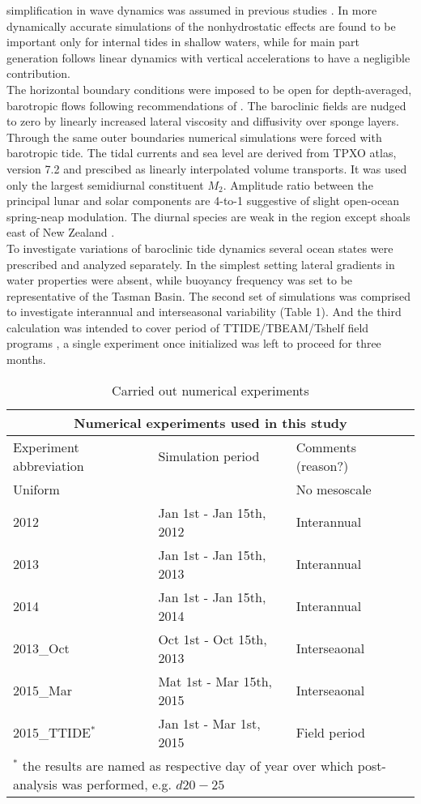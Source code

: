 \documentclass[12pt]{article}
\begin{document}
simplification in wave dynamics was assumed in previous studies \citep{carter2008energetics, 
merrifield2001generation,  merrifield2002model, kerry2013effects}. In more dynamically accurate   
simulations of \citep{kang2012energetics, zhang2011three} the nonhydrostatic effects are found to 
be important only for internal tides in shallow waters, while for main part generation follows 
linear dynamics with vertical accelerations to have a negligible contribution.\\
The horizontal boundary conditions were imposed to be open for depth-averaged, barotropic flows 
following recommendations of \citep{marchesiello2001open}. The baroclinic fields are 
nudged to zero by linearly increased lateral viscosity and diffusivity over sponge layers. Through 
the same outer boundaries numerical simulations were forced with barotropic tide. The tidal 
currents and sea level are derived from TPXO atlas, version 7.2 \citep{egbert2002efficient} and 
prescibed as linearly interpolated volume transports. It was used only the largest semidiurnal 
constituent $M_2$. Amplitude ratio between the principal lunar and solar components are 4-to-1 
suggestive of slight open-ocean spring-neap modulation. The diurnal species are weak in the region 
except shoals east of New Zealand \citep{walters2001ocean}.\\
To investigate variations of baroclinic tide dynamics several ocean states were prescribed and 
analyzed separately. In the simplest setting lateral gradients in water properties were absent, 
while buoyancy frequency was set to be representative of the Tasman Basin. The second set of 
simulations 
was comprised to investigate interannual and interseasonal variability (Table 1). And the third 
calculation was intended to cover period of TTIDE/TBEAM/Tshelf field programs 
\citep{pinkel2015breaking}, a single experiment once initialized was left to proceed for three 
months.
\begin{table}
	\caption{Carried out numerical experiments}
	\begin{tabular}{ |p{3cm}||p{5cm}|p{5cm}|  }
		\hline
		\multicolumn{3}{|c|}{Numerical experiments used in this study} \\
		\hline
		Experiment abbreviation & Simulation period & Comments (reason?) \\
		\hline
		Uniform & ~ & No mesoscale \\
		2012 &   Jan 1st - Jan 15th, 2012 & Interannual \\
		2013 &   Jan 1st - Jan 15th, 2013 & Interannual \\
		2014 &   Jan 1st - Jan 15th, 2014 & Interannual \\
		2013\_Oct &   Oct 1st - Oct 15th, 2013 & Interseaonal \\
		2015\_Mar &   Mat 1st - Mar 15th, 2015 & Interseaonal \\
		2015\_TTIDE$^{\ast}$ &   Jan 1st - Mar 1st, 2015 & Field period \\
		\hline
		\multicolumn{3}{|l|}{\footnotesize$^{\ast}$ the results are named as respective day of 
		year over which post-analysis was performed, e.g. $d20-25$ }\\
		\hline
	\end{tabular}
	\label{ch2:table_exp}
\end{table}
\end{document}
